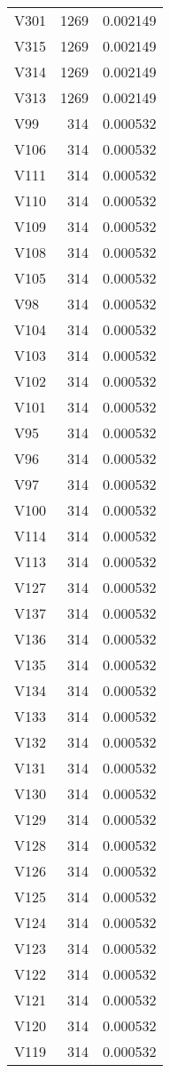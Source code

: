 \begin{tabular}{lrr}
V301 & 1269 & 0.002149 \\
V315 & 1269 & 0.002149 \\
V314 & 1269 & 0.002149 \\
V313 & 1269 & 0.002149 \\
V99 & 314 & 0.000532 \\
V106 & 314 & 0.000532 \\
V111 & 314 & 0.000532 \\
V110 & 314 & 0.000532 \\
V109 & 314 & 0.000532 \\
V108 & 314 & 0.000532 \\
V105 & 314 & 0.000532 \\
V98 & 314 & 0.000532 \\
V104 & 314 & 0.000532 \\
V103 & 314 & 0.000532 \\
V102 & 314 & 0.000532 \\
V101 & 314 & 0.000532 \\
V95 & 314 & 0.000532 \\
V96 & 314 & 0.000532 \\
V97 & 314 & 0.000532 \\
V100 & 314 & 0.000532 \\
V114 & 314 & 0.000532 \\
V113 & 314 & 0.000532 \\
V127 & 314 & 0.000532 \\
V137 & 314 & 0.000532 \\
V136 & 314 & 0.000532 \\
V135 & 314 & 0.000532 \\
V134 & 314 & 0.000532 \\
V133 & 314 & 0.000532 \\
V132 & 314 & 0.000532 \\
V131 & 314 & 0.000532 \\
V130 & 314 & 0.000532 \\
V129 & 314 & 0.000532 \\
V128 & 314 & 0.000532 \\
V126 & 314 & 0.000532 \\
V125 & 314 & 0.000532 \\
V124 & 314 & 0.000532 \\
V123 & 314 & 0.000532 \\
V122 & 314 & 0.000532 \\
V121 & 314 & 0.000532 \\
V120 & 314 & 0.000532 \\
V119 & 314 & 0.000532 \\

\end{tabular}
